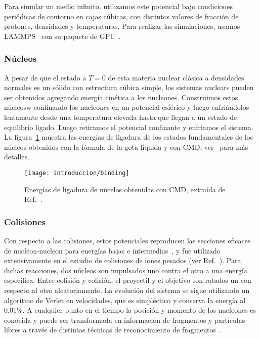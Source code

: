 Para simular un medio infinito, utilizamos este potencial bajo condiciones periódicas de contorno en cajas cúbicas, con distintos valores de fracción de protones, densidades y temperaturas.
Para realizar las simulaciones, usamos LAMMPS~\cite{plimpton_fast_1995} con su paquete de GPU~\cite{brown_implementing_2012}.

\subsubsection{Núcleos}
A pesar de que el estado a $T=0$ de esta materia nuclear clásica a densidades normales es un sólido con estructura cúbica simple, los sistemas nuclears pueden ser obtenidos agregando energía cinética a los nucleones.
Construimos estos núcleosw confinando los nucleones en un potencial esférico y luego enfriándolos lentamente desde una temperatura elevada hasta que llegan a un estado de equilibrio ligado.
Luego retiramos el potencial confinante y enfriamos el sistema.
La figura~\ref{fig:binding} muestra las energías de ligadura de los estados fundamentales de los núcleos obtenidos con la fórmula de la gota líquida y con CMD; ver~\cite{dorso_isoscaling_2011} para más detalles.

\begin{figure}[h]
  \centering
  \texttt{[image: introduccion/binding]}
  \caption{Energías de ligadura de núcelos obtenidas con CMD, extraída de Ref.~\cite{dorso_isoscaling_2011}.}
\label{fig:binding}
\end{figure}

\subsubsection{Colisiones}
Con respecto a las colisiones, estos potenciales reproducen las secciones eficaces de nucleon-nucleon para energías bajas e intermedias~\cite{lenk_accuracy_1990}, y fue utilizado extensivamente en el estudio de colisiones de iones pesados (ver Ref.~\cite{chernomoretz_quasiclassical_2002, barranon_time_2007}).
Para dichas reacciones, dos núcleos son impulsados uno contra el otro a una energía específica.
Entre colisión y colisión, el proyectil y el objetivo son rotados un con respecto al otro aleatoriamente.
La evolución del sistema se sigue utilizando un algoritmo de Verlet en velocidades, que es simpléctico y conserva la energía al 0.01\%.
A cualquier punto en el tiempo la posición y momento de los nucleones es conocida y puede ser transformada en información de fragmentos y partículas libres a través de distintas técnicas de reconocimiento de fragmentos~\cite{dorso_when_1995,strachan_time_1997}.

